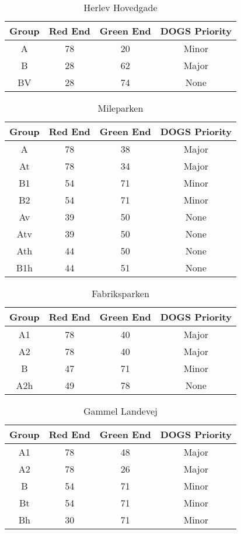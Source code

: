 \begin{table}[ht]
\centering
\begin{tabular}{c|c|c|c}
\textbf{Group} & \textbf{Red End} & \textbf{Green End} & \textbf{DOGS Priority}\\ \hline
A & 78 & 20 & Minor\\
B & 28 & 62 & Major\\
BV & 28 & 74 & None\\
\end{tabular}
\caption{Herlev Hovedgade}
\end{table}



\begin{table}[ht]
\centering
\begin{tabular}{c|c|c|c}
\textbf{Group} & \textbf{Red End} & \textbf{Green End} & \textbf{DOGS Priority}\\ \hline
A & 78 & 38 & Major\\
At & 78 & 34 & Major\\
B1 & 54 & 71 & Minor\\
B2 & 54 & 71 & Minor\\
Av & 39 & 50 & None\\
Atv & 39 & 50 & None\\
Ath & 44 & 50 & None\\
B1h & 44 & 51 & None\\
\end{tabular}
\caption{Mileparken}
\end{table}



\begin{table}[ht]
\centering
\begin{tabular}{c|c|c|c}
\textbf{Group} & \textbf{Red End} & \textbf{Green End} & \textbf{DOGS Priority}\\ \hline
A1 & 78 & 40 & Major\\
A2 & 78 & 40 & Major\\
B & 47 & 71 & Minor\\
A2h & 49 & 78 & None\\
\end{tabular}
\caption{Fabriksparken}
\end{table}



\begin{table}[ht]
\centering
\begin{tabular}{c|c|c|c}
\textbf{Group} & \textbf{Red End} & \textbf{Green End} & \textbf{DOGS Priority}\\ \hline
A1 & 78 & 48 & Major\\
A2 & 78 & 26 & Major\\
B & 54 & 71 & Minor\\
Bt & 54 & 71 & Minor\\
Bh & 30 & 71 & Minor\\
\end{tabular}
\caption{Gammel Landevej}
\end{table}



